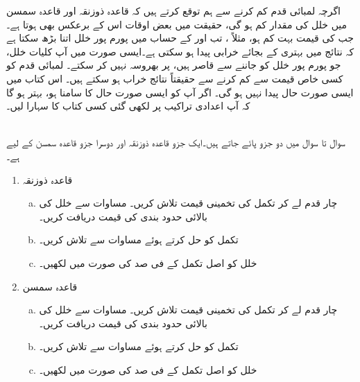اگرچہ لمبائی قدم  کم کرنے سے ہم توقع کرتے ہیں کہ قاعدہ ذوزنقہ اور قاعدہ سمسن میں خلل کی مقدار کم ہو گی، حقیقت میں بعض اوقات اس کے برعکس بھی ہوتا ہے۔جب  کی قیمت بہت کم ہو، مثلاً ، تب  اور  کے  حساب میں پورم پور خلل اتنا بڑھ سکتا ہے کہ نتائج میں بہتری کے بجائے خرابی پیدا ہو سکتی ہے۔ایسی صورت میں آپ کلیات خلل، جو پورم پور خلل کو جاننے سے قاصر ہیں، پر بھروسہ نہیں کر سکتے۔ لمبائی قدم  کو کسی خاص قیمت سے کم کرنے سے حقیقتاً نتائج خراب ہو سکتے ہیں۔ اس کتاب میں ایسی صورت حال پیدا نہیں ہو گی۔ اگر آپ کو ایسی صورت حال کا سامنا ہو، بہتر ہو گا کہ آپ اعدادی تراکیب پر لکھی گئی کسی کتاب کا سہارا لیں۔

\\
سوال  تا سوال  میں دو جزو پائے جاتے ہیں۔ایک جزو قاعدہ ذوزنقہ اور دوسرا جزو قاعدہ سمسن کے  لیے ہے۔
\begin{enumerate}[1.]
\item
قاعدہ ذوزنقہ
\begin{enumerate}[a.]
\item
چار قدم  لے کر تکمل کی تخمینی قیمت تلاش کریں۔ مساوات  سے خلل  کی بالائی حدود بندی کی قیمت دریافت کریں۔
\item
تکمل کو حل کرتے ہوئے مساوات  سے  تلاش کریں۔
\item
خلل  کو اصل تکمل  کے فی صد کی صورت میں لکھیں۔
\end{enumerate}
\item
قاعدہ سمسن
\begin{enumerate}[a.]
\item
چار قدم  لے کر تکمل کی تخمینی قیمت تلاش کریں۔ مساوات   سے خلل  کی بالائی حدود بندی کی قیمت دریافت کریں۔
\item
تکمل کو حل کرتے ہوئے مساوات  سے  تلاش کریں۔
\item
خلل  کو اصل تکمل  کے فی صد کی صورت میں لکھیں۔
\end{enumerate}
\end{enumerate}

